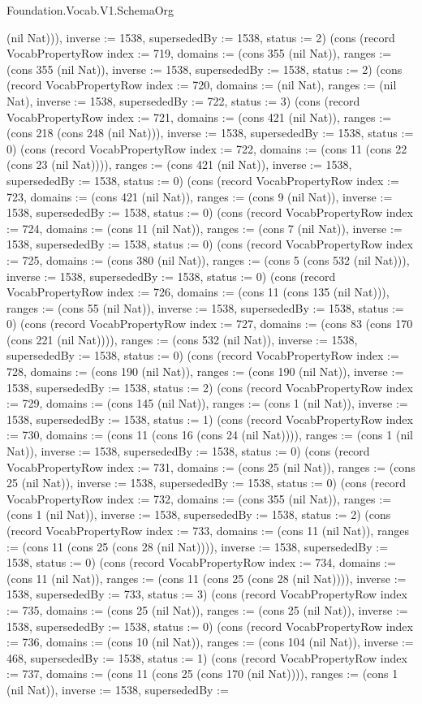 \begin{lexlean}{Foundation.Vocab.V1.SchemaOrg}
\begin{semanticmodule}
{(nil Nat))), inverse := 1538, supersededBy := 1538, status := 2}) (cons (record VocabPropertyRow {index := 719, domains := (cons 355 (nil Nat)), ranges := (cons 355 (nil Nat)), inverse := 1538, supersededBy := 1538, status := 2}) (cons (record VocabPropertyRow {index := 720, domains := (nil Nat), ranges := (nil Nat), inverse := 1538, supersededBy := 722, status := 3}) (cons (record VocabPropertyRow {index := 721, domains := (cons 421 (nil Nat)), ranges := (cons 218 (cons 248 (nil Nat))), inverse := 1538, supersededBy := 1538, status := 0}) (cons (record VocabPropertyRow {index := 722, domains := (cons 11 (cons 22 (cons 23 (nil Nat)))), ranges := (cons 421 (nil Nat)), inverse := 1538, supersededBy := 1538, status := 0}) (cons (record VocabPropertyRow {index := 723, domains := (cons 421 (nil Nat)), ranges := (cons 9 (nil Nat)), inverse := 1538, supersededBy := 1538, status := 0}) (cons (record VocabPropertyRow {index := 724, domains := (cons 11 (nil Nat)), ranges := (cons 7 (nil Nat)), inverse := 1538, supersededBy := 1538, status := 0}) (cons (record VocabPropertyRow {index := 725, domains := (cons 380 (nil Nat)), ranges := (cons 5 (cons 532 (nil Nat))), inverse := 1538, supersededBy := 1538, status := 0}) (cons (record VocabPropertyRow {index := 726, domains := (cons 11 (cons 135 (nil Nat))), ranges := (cons 55 (nil Nat)), inverse := 1538, supersededBy := 1538, status := 0}) (cons (record VocabPropertyRow {index := 727, domains := (cons 83 (cons 170 (cons 221 (nil Nat)))), ranges := (cons 532 (nil Nat)), inverse := 1538, supersededBy := 1538, status := 0}) (cons (record VocabPropertyRow {index := 728, domains := (cons 190 (nil Nat)), ranges := (cons 190 (nil Nat)), inverse := 1538, supersededBy := 1538, status := 2}) (cons (record VocabPropertyRow {index := 729, domains := (cons 145 (nil Nat)), ranges := (cons 1 (nil Nat)), inverse := 1538, supersededBy := 1538, status := 1}) (cons (record VocabPropertyRow {index := 730, domains := (cons 11 (cons 16 (cons 24 (nil Nat)))), ranges := (cons 1 (nil Nat)), inverse := 1538, supersededBy := 1538, status := 0}) (cons (record VocabPropertyRow {index := 731, domains := (cons 25 (nil Nat)), ranges := (cons 25 (nil Nat)), inverse := 1538, supersededBy := 1538, status := 0}) (cons (record VocabPropertyRow {index := 732, domains := (cons 355 (nil Nat)), ranges := (cons 1 (nil Nat)), inverse := 1538, supersededBy := 1538, status := 2}) (cons (record VocabPropertyRow {index := 733, domains := (cons 11 (nil Nat)), ranges := (cons 11 (cons 25 (cons 28 (nil Nat)))), inverse := 1538, supersededBy := 1538, status := 0}) (cons (record VocabPropertyRow {index := 734, domains := (cons 11 (nil Nat)), ranges := (cons 11 (cons 25 (cons 28 (nil Nat)))), inverse := 1538, supersededBy := 733, status := 3}) (cons (record VocabPropertyRow {index := 735, domains := (cons 25 (nil Nat)), ranges := (cons 25 (nil Nat)), inverse := 1538, supersededBy := 1538, status := 0}) (cons (record VocabPropertyRow {index := 736, domains := (cons 10 (nil Nat)), ranges := (cons 104 (nil Nat)), inverse := 468, supersededBy := 1538, status := 1}) (cons (record VocabPropertyRow {index := 737, domains := (cons 11 (cons 25 (cons 170 (nil Nat)))), ranges := (cons 1 (nil Nat)), inverse := 1538, supersededBy := }
\end{semanticmodule}
\end{lexlean}
